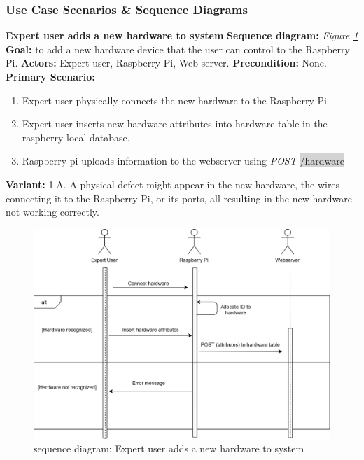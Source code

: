 \documentclass[12pt, oneside, a4paper]{book}
\newcommand{\code}[1]{{\color{red}\colorbox{lightgray}{#1}}}
\newcommand\boldcolor[1]{\textcolor{bold}{\textbf{#1}}}
\begin{document}
				\newpage\subsubsection{Use Case Scenarios \& Sequence Diagrams}
				\boldcolor{Expert user adds a new hardware to system}
				\newline\textbf{Sequence diagram:} \textit{Figure \ref{admin_hw}}
				\newline\textbf{Goal:} to add a new hardware device that the user can control to the Raspberry Pi.
				\newline\textbf{Actors:} Expert user, Raspberry Pi, Web server.
				\newline\textbf{Precondition:} None.
				\newline\textbf{Primary Scenario:}	
				\begin{enumerate}[label*=\arabic*.]
					\item Expert user physically connects the new hardware to the Raspberry Pi
					\item Expert user inserts new hardware attributes into hardware table in the raspberry local database. 
					\item Raspberry pi uploads information to the webserver using \textit{POST} \code{/hardware}
				\end{enumerate}
				\textbf{Variant:}\newline
				\hspace*{5mm}1.A. A physical defect might appear in the new hardware, the wires connecting it to the Raspberry Pi, or its ports, all resulting in the new hardware not working correctly. \\
				\begin{figure}[H]
					\includegraphics[width=\linewidth]{img/sequence_add_hardware.png}
					\caption{sequence diagram: Expert user adds a new hardware to system}
					\label{admin_hw}
				\end{figure} 
\end{document}
